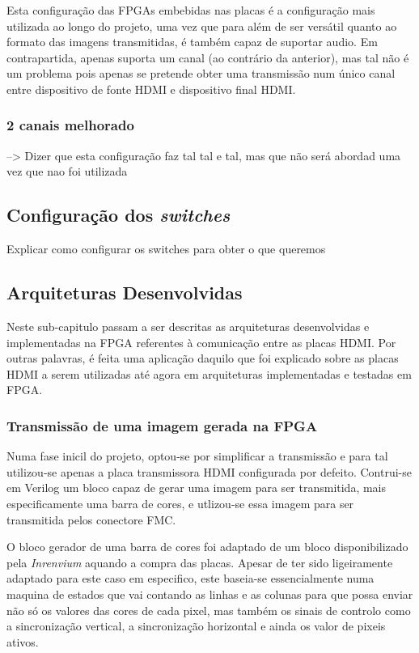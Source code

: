 Esta configuração das FPGAs embebidas nas placas é a configuração mais utilizada ao longo do projeto, uma vez que para além de ser versátil quanto ao formato das imagens transmitidas, é também capaz de suportar audio. Em contrapartida, apenas suporta um canal (ao contrário da anterior), mas tal não é um problema pois apenas se pretende obter uma transmissão num único canal entre dispositivo de fonte HDMI e dispositivo final HDMI. 


\subsubsection{2 canais melhorado} \label{subsubsec:HDMIconfigMelhorado}

--> Dizer que esta configuração faz tal tal e tal, mas que não será abordad uma vez que nao foi utilizada

\subsection{Configuração dos \textit{switches}}

Explicar como configurar os switches para obter o que queremos

\subsection{Arquiteturas Desenvolvidas} \label{subsec:HDMIarquiteturas}

Neste sub-capitulo passam a ser descritas as arquiteturas desenvolvidas e implementadas na FPGA referentes à comunicação entre as placas HDMI.  Por outras palavras, é feita uma aplicação daquilo que foi explicado sobre as placas HDMI a serem utilizadas até agora em arquiteturas implementadas e testadas em FPGA.

\subsubsection{Transmissão de uma imagem gerada na FPGA}

Numa fase inicil do projeto, optou-se por simplificar a transmissão e para tal utilizou-se apenas a placa transmissora HDMI configurada por defeito. Contrui-se em Verilog um bloco capaz de gerar uma imagem para ser transmitida, mais especificamente uma barra de cores, e utlizou-se essa imagem para ser transmitida pelos conectore FMC.

O bloco gerador de uma barra de cores foi adaptado de um bloco disponibilizado pela \textit{Inrenvium} aquando a compra das placas. Apesar de ter sido ligeiramente adaptado para este caso em especifico, este baseia-se essencialmente numa maquina de estados que vai contando as linhas e as colunas para que possa enviar não só os valores das cores de cada pixel, mas também os sinais de controlo como a sincronização vertical, a sincronização horizontal e ainda os valor de pixeis ativos.

